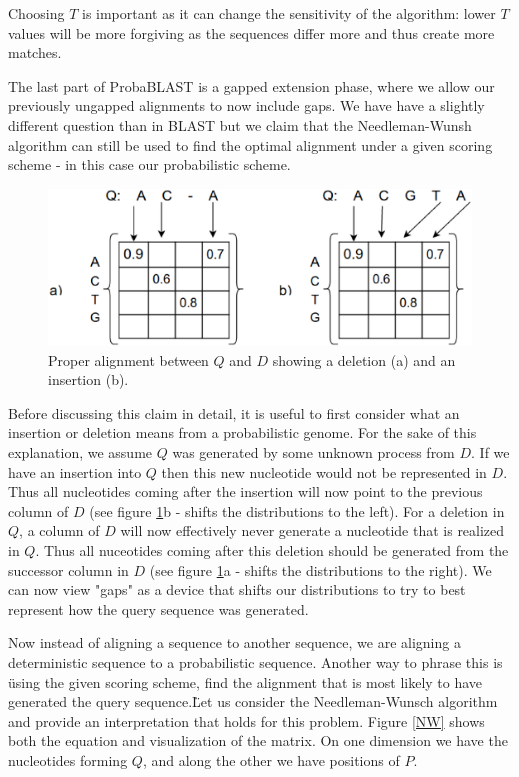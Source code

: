 \documentclass[12pt]{IEEEtran}
\begin{document}
Choosing $T$ is important as it can change the sensitivity of the algorithm: lower $T$ values will be more forgiving as the sequences differ more and thus create more matches.

The last part of ProbaBLAST is a gapped extension phase, where we allow our previously ungapped alignments to now include gaps. We have have a slightly different question than in BLAST but we claim that the Needleman-Wunsh algorithm can still be used to find the optimal alignment under a given scoring scheme - in this case our probabilistic scheme.

\begin{figure}
    \centering
    \includegraphics[scale=0.5]{indel}
    \caption{Proper alignment between $Q$ and $D$ showing a deletion (a) and an insertion (b).}
    \label{indel}
\end{figure}

Before discussing this claim in detail, it is useful to first consider what an insertion or deletion means from a probabilistic genome. For the sake of this explanation, we assume $Q$ was generated by some unknown process from $D$. If we have an insertion into $Q$ then this new nucleotide would not be represented in $D$. Thus all nucleotides coming after the insertion will now point to the previous column of $D$ (see figure \ref{indel}b - shifts the distributions to the left). For a deletion in $Q$, a column of $D$ will now effectively never generate a nucleotide that is realized in $Q$. Thus all nuceotides coming after this deletion should be generated from the successor column in $D$ (see figure \ref{indel}a - shifts the distributions to the right). We can now view "gaps" as a device that shifts our distributions to try to best represent how the query sequence was generated.

Now instead of aligning a sequence to another sequence, we are aligning a deterministic sequence to a probabilistic sequence. Another way to phrase this is \"using the given scoring scheme, find the alignment that is most likely to have generated the query sequence.\" Let us consider the Needleman-Wunsch algorithm and provide an interpretation that holds for this problem. Figure \ref{NW} shows both the equation and visualization of the matrix. On one dimension we have the nucleotides forming $Q$, and along the other we have positions of $P$. 
\end{document}

